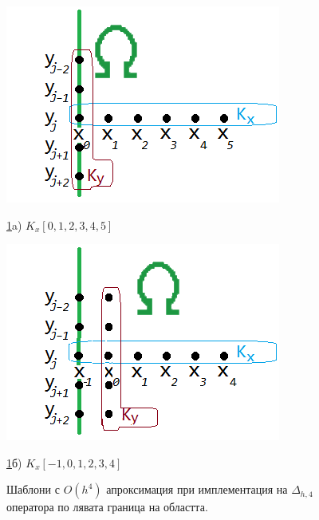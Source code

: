 \documentclass[a4paper]{article}
\theoremstyle{remark}
\begin{document}
\begin{large}
\begin{figure}%
	\begin{minipage}[b]{0.33\linewidth}
		\raggedleft
		\includegraphics[width=\linewidth]{LeftBoundary.png}
		\centerline{\ref{fig:LeftBoundary}a) $K_x[0,1,2,3,4,5]$ }
	\end{minipage}	
	\begin{minipage}[b]{0.33\linewidth}
		\raggedright
		 \includegraphics[width=\linewidth]{LeftBoundaryB.png}
		\centerline{\ref{fig:LeftBoundary}б) $K_x[-1,0,1,2,3,4]$ }
	\end{minipage}

	\caption{Шаблони с $O(h^4)$ апроксимация при имплементация на $\Delta_{h,4}$ оператора по лявата граница на областта.}
	\label{fig:LeftBoundary}
\end{figure}


\end{large}
\end{document}
